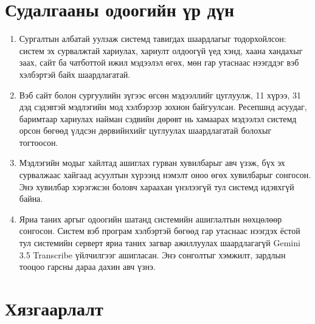 \section{Судалгааны одоогийн үр дүн}
\label{sec:conclusion-main}

\begin{enumerate}
    \item Сургалтын албатай уулзаж системд тавигдах шаардлагыг тодорхойлсон: систем эх сурвалжтай хариулах, хариулт олдоогүй үед хэнд, хаана хандахыг заах, сайт ба чатботтой ижил мэдээлэл өгөх, мөн гар утаснаас нээгддэг вэб хэлбэртэй байх шаардлагатай.
    \item Вэб сайт болон сургуулийн зүгээс өгсөн мэдээллийг цуглуулж, 11 хүрээ, 31 дэд сэдэвтэй мэдлэгийн мод хэлбэрээр зохион байгуулсан. Ресепшнд асуудаг, баримтаар хариулах найман сэдвийн дөрөвт нь хамаарах мэдээлэл системд орсон бөгөөд үлдсэн дөрвийнхийг цуглуулах шаардлагатай болохыг тогтоосон.
    \item Мэдлэгийн модыг хайлтад ашиглах гурван хувилбарыг авч үзэж, бүх эх сурвалжаас хайгаад асуултын хүрээнд нэмэлт оноо өгөх хувилбарыг сонгосон. Энэ хувилбар хэрэгжсэн боловч хараахан үнэлээгүй тул системд идэвхгүй байна.
    \item Яриа таних аргыг одоогийн шатанд системийн ашиглалтын нөхцөлөөр сонгосон. Систем вэб програм хэлбэртэй бөгөөд гар утаснаас нээгдэх ёстой тул системийн серверт яриа таних загвар ажиллуулах шаардлагагүй Gemini 3.5 Transcribe үйлчилгээг ашигласан. Энэ сонголтыг хэмжилт, зардлын тооцоо гарсны дараа дахин авч үзнэ.
\end{enumerate}

\section{Хязгаарлалт}
\label{sec:limits}

